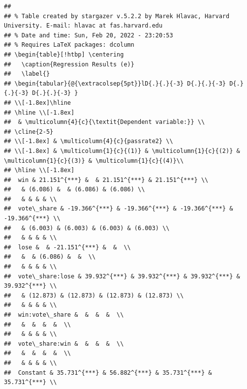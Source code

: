 \documentclass[
  12pt,
  landscape]{article}
\begin{document}
\begin{verbatim}
## 
## % Table created by stargazer v.5.2.2 by Marek Hlavac, Harvard University. E-mail: hlavac at fas.harvard.edu
## % Date and time: Sun, Feb 20, 2022 - 23:20:53
## % Requires LaTeX packages: dcolumn 
## \begin{table}[!htbp] \centering 
##   \caption{Regression Results (e)} 
##   \label{} 
## \begin{tabular}{@{\extracolsep{5pt}}lD{.}{.}{-3} D{.}{.}{-3} D{.}{.}{-3} D{.}{.}{-3} } 
## \\[-1.8ex]\hline 
## \hline \\[-1.8ex] 
##  & \multicolumn{4}{c}{\textit{Dependent variable:}} \\ 
## \cline{2-5} 
## \\[-1.8ex] & \multicolumn{4}{c}{passrate2} \\ 
## \\[-1.8ex] & \multicolumn{1}{c}{(1)} & \multicolumn{1}{c}{(2)} & \multicolumn{1}{c}{(3)} & \multicolumn{1}{c}{(4)}\\ 
## \hline \\[-1.8ex] 
##  win & 21.151^{***} &  & 21.151^{***} & 21.151^{***} \\ 
##   & (6.086) &  & (6.086) & (6.086) \\ 
##   & & & & \\ 
##  vote\_share & -19.366^{***} & -19.366^{***} & -19.366^{***} & -19.366^{***} \\ 
##   & (6.003) & (6.003) & (6.003) & (6.003) \\ 
##   & & & & \\ 
##  lose &  & -21.151^{***} &  &  \\ 
##   &  & (6.086) &  &  \\ 
##   & & & & \\ 
##  vote\_share:lose & 39.932^{***} & 39.932^{***} & 39.932^{***} & 39.932^{***} \\ 
##   & (12.873) & (12.873) & (12.873) & (12.873) \\ 
##   & & & & \\ 
##  win:vote\_share &  &  &  &  \\ 
##   &  &  &  &  \\ 
##   & & & & \\ 
##  vote\_share:win &  &  &  &  \\ 
##   &  &  &  &  \\ 
##   & & & & \\ 
##  Constant & 35.731^{***} & 56.882^{***} & 35.731^{***} & 35.731^{***} \\ 

\end{verbatim}
\end{document}
